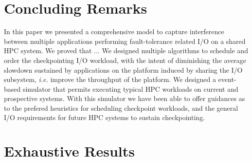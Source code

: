 \documentclass[conference]{IEEEtran}
\newcommand{\ie}[0]{\emph{i.e.}\xspace}
\begin{document}
\section{Concluding Remarks}\label{sec:conclusion}

In this paper we presented a comprehensive model to capture interference
between multiple applications performing fault-tolerance related I/O
on a shared HPC system. We proved that ... We designed multiple algorithms
to schedule and order the checkpointing I/O workload, with the intent of
diminishing the average slowdown sustained by applications on the
platform induced by sharing the I/O subsystem, \ie improve the throughput
of the platform. We designed a event-based simulator that permits
executing typical HPC workloads on current and prospective systems.
With this simulator we have been able to offer guidances as to the
prefered heuristics for scheduling checkpoint workloads, and the
general I/O requirements for future HPC systems to sustain checkpointing.







\newpage
\appendix

\section{Exhaustive Results}
\end{document}
